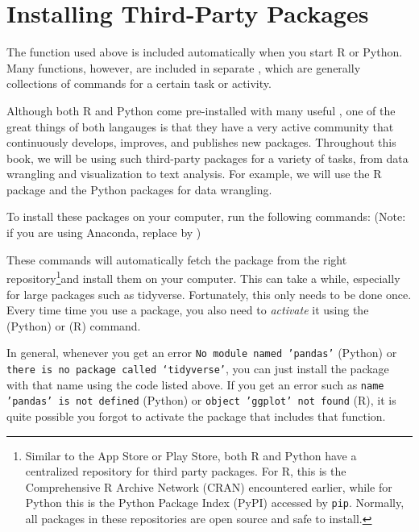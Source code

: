 \section{Installing Third-Party Packages}

The  function used above is included automatically when you start R or Python.
Many functions, however, are included in separate , which are
generally collections of commands for a certain task or activity.

Although both R and Python come pre-installed with many useful ,
one of the great things of both langauges is that they have a very active community that continuously develops, improves, and publishes new packages.
Throughout this book, we will be using such third-party packages for a variety of tasks, from data wrangling and visualization to text analysis.
For example, we will use the R package  and the Python packages  for data wrangling.

To install these packages on your computer, run the following commands:
(Note: if you are using Anaconda, replace  by )  

\begin{tcbraster}[raster columns=2,raster equal height=rows,raster valign=top]
\end{tcbraster}

\newcommand{\fnrepo}{\footnote{Similar to the App Store or Play Store, both R and Python have a centralized repository for third party packages.  For R, this is the Comprehensive R Archive Network (CRAN) encountered earlier,
    while for Python this is the Python Package Index (PyPI) accessed by \verb|pip|.  Normally, all packages in these repositories are open source and safe to install.}}

These commands will automatically fetch the package from the right repository\fnrepo and install them on your computer. This can take a while, especially for large packages such as tidyverse.
Fortunately, this only needs to be done once.
Every time time you use a package, you also need to \emph{activate} it using the  (Python) or   (R) command.

In general, whenever you get an error \texttt{No module named 'pandas'} (Python) or \texttt{there is no package called ‘tidyverse’},
you can just install the package with that name using the code listed above.
If you get an error such as \texttt{name 'pandas' is not defined} (Python) or \texttt{object 'ggplot' not found} (R),
it is quite possible you forgot to activate the package that includes that function. 


